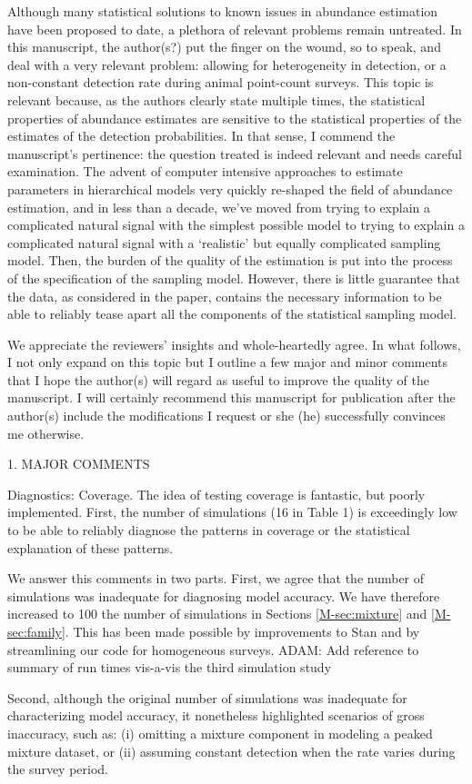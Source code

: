 \documentclass[12pt]{article}
\renewenvironment{quote}  %
              {\list{}{\rightmargin\leftmargin}\normalfont%
               \item\relax}
              {\endlist}
\newcommand{\adam}[1]{{\color{blue} ADAM: #1}}
\begin{document}
Although many statistical solutions to known issues in abundance estimation have been proposed to date, a plethora of relevant problems remain untreated.  In this manuscript, the author(s?) put the finger on the wound, so to speak, and deal with a very relevant problem: allowing for heterogeneity in detection, or a non-constant detection rate during animal point-count surveys.  This topic is relevant because, as the authors clearly state multiple times, the statistical properties of abundance estimates are sensitive to the statistical properties of the estimates of the detection probabilities. In that sense, I commend the manuscript's pertinence: the question treated is indeed relevant and needs careful examination.
The advent of computer intensive approaches to estimate parameters in hierarchical models very quickly re-shaped the field of abundance estimation, and in less than a decade, we've moved from trying to explain a complicated natural signal with the simplest possible model to trying to explain a complicated natural signal with a `realistic' but equally complicated sampling model. Then, the burden of the quality of the estimation is put into the process of the specification of the sampling model. However, there is little guarantee that the data, as considered in the paper, contains the necessary information to be able to reliably tease apart all the components of the statistical sampling model. 
\begin{quote}
We appreciate the reviewers' insights and whole-heartedly agree.
\end{quote}
In what follows, I not only expand on this topic but I outline a few major and minor comments that I hope the author(s) will regard as useful to improve the quality of the manuscript. I will certainly recommend this manuscript for publication after the author(s) include the
modifications I request or she (he) successfully convinces me otherwise.



1. MAJOR COMMENTS


Diagnostics: Coverage. The idea of testing coverage is fantastic, but poorly implemented. First, the number of simulations (16 in Table 1) is exceedingly low to be able to reliably diagnose the patterns in coverage or the statistical explanation of these patterns. 
\begin{quote}
We answer this comments in two parts.
First, we agree that the number of simulations was inadequate for diagnosing model accuracy.
We have therefore increased to 100 the number of simulations in Sections \ref{M-sec:mixture} and \ref{M-sec:family}.
This has been made possible by improvements to Stan \citep{Rstan2016} and by streamlining our code for homogeneous surveys.
\adam{Add reference to summary of run times vis-a-vis the third simulation study}

Second, although the original number of simulations was inadequate for characterizing model accuracy, it nonetheless highlighted scenarios of gross inaccuracy, such as: (i) omitting a mixture component in modeling a peaked mixture dataset, or (ii) assuming constant detection when the rate varies during the survey period.
\end{quote}
\end{document}
